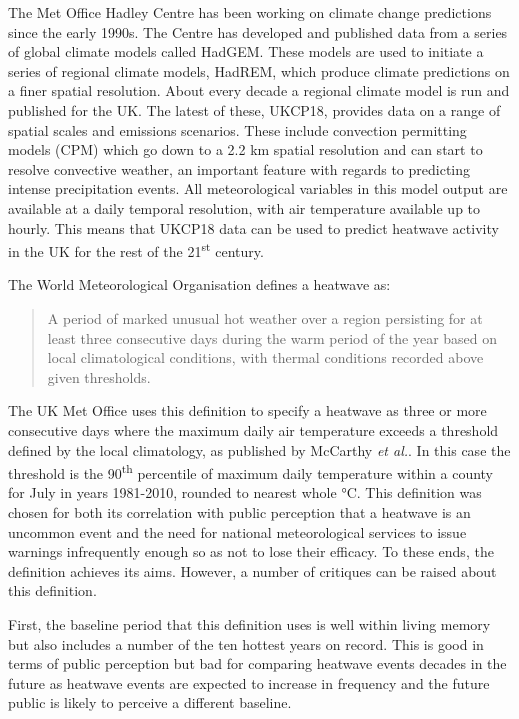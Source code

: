 \documentclass[10pt,letterpaper]{article}
\begin{document}
The Met Office Hadley Centre has been working on climate change predictions since the early 1990s.
The Centre has developed and published data from a series of global climate models called HadGEM.
These models are used to initiate a series of regional climate models, HadREM, which produce climate predictions on a finer spatial resolution.
About every decade a regional climate model is run and published for the UK.
The latest of these, UKCP18, provides data on a range of spatial scales and emissions scenarios.\cite{UKCP18}
These include convection permitting models (CPM) which go down to a 2.2 km spatial resolution and can start to resolve convective weather, an important feature with regards to predicting intense precipitation events.
All meteorological variables in this model output are available at a daily temporal resolution, with air temperature available up to hourly.
This means that UKCP18 data can be used to predict heatwave activity in the UK for the rest of the 21\textsuperscript{st} century.

\pagebreak
\noindent
The World Meteorological Organisation defines a heatwave as:
\begin{quote}
    A period of marked unusual hot weather over a region persisting for at least three consecutive days during the warm period of the year based on local climatological conditions, with thermal conditions recorded above given thresholds.\cite{WMO2018}
\end{quote}
The UK Met Office uses this definition to specify a heatwave as three or more consecutive days where the maximum daily air temperature exceeds a threshold defined by the local climatology, as published by McCarthy \textit{et al.}.\cite{McCarthy2019}
In this case the threshold is the 90{\textsuperscript{th}} percentile of maximum daily temperature within a county for July in years 1981-2010, rounded to nearest whole °C.
This definition was chosen for both its correlation with public perception that a heatwave is an uncommon event and the need for national meteorological services to issue warnings infrequently enough so as not to lose their efficacy.
To these ends, the definition achieves its aims.
However, a number of critiques can be raised about this definition.

First, the baseline period that this definition uses is well within living memory but also includes a number of the ten hottest years on record.\cite{McCarthy2019}
This is good in terms of public perception but bad for comparing heatwave events decades in the future as heatwave events are expected to increase in frequency and the future public is likely to perceive a different baseline.
\end{document}
